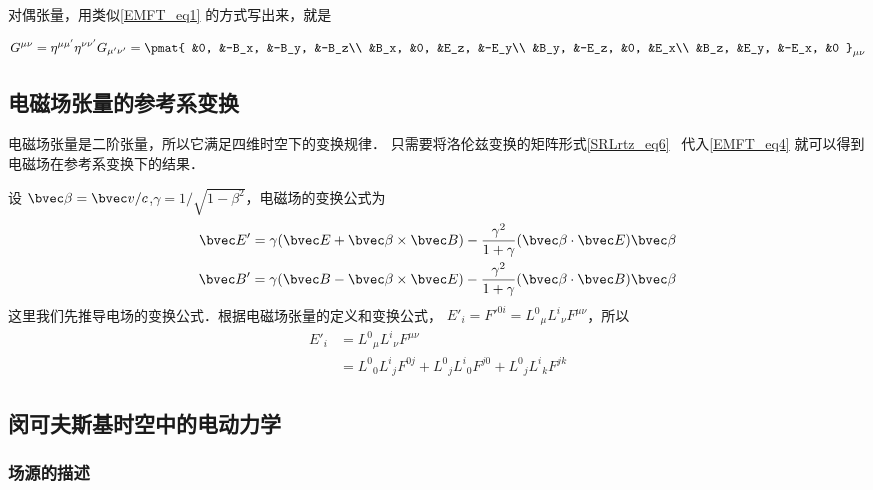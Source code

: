 对偶张量，用类似\autoref{EMFT_eq1} 的方式写出来，就是

\begin{equation}
\begin{aligned}
G^{\mu\nu}=\eta^{\mu\mu'}\eta^{\nu\nu'}G_{\mu'\nu'}=
\pmat{
&0, &-B_x, &-B_y, &-B_z\\ 
&B_x, &0, &E_z, &-E_y\\ 
&B_y, &-E_z, &0, &E_x\\
&B_z, &E_y, &-E_x, &0
}_{\mu\nu}
\end{aligned}
\end{equation}

\subsection{电磁场张量的参考系变换}
电磁场张量是二阶张量，所以它满足四维时空下的变换规律．
只需要将洛伦兹变换的矩阵形式\autoref{SRLrtz_eq6}~ 代入\autoref{EMFT_eq4} 就可以得到电磁场在参考系变换下的结果．

设 $\bvec \beta=\bvec v/c$,$\gamma=1/\sqrt{1-\beta^2}$，电磁场的变换公式为
\begin{equation}
\begin{aligned}
\bvec E'=\gamma(\bvec E+\bvec \beta\times \bvec B)-\frac{\gamma^2}{1+\gamma}(\bvec \beta \cdot \bvec E)\bvec \beta\\
\bvec B'=\gamma(\bvec B-\bvec \beta\times \bvec E)-\frac{\gamma^2}{1+\gamma}(\bvec \beta \cdot \bvec B)\bvec \beta
\end{aligned}
\end{equation}
这里我们先推导电场的变换公式．根据电磁场张量的定义和变换公式， $E'_i=F'^{0i}={L^0}_\mu {L^i}_{\nu} F^{\mu\nu}$，所以
\begin{equation}
\begin{aligned}
E'_i&={L^0}_\mu {L^i}_\nu F^{\mu\nu}\\
&={L^0}_0 {L^i}_j F^{0j}+{L^0}_j {L^i}_0 F^{j0} + {L^0}_j {L^i}_k F^{jk} 
\end{aligned}
\end{equation}

\subsection{闵可夫斯基时空中的电动力学}

\subsubsection{场源的描述}

